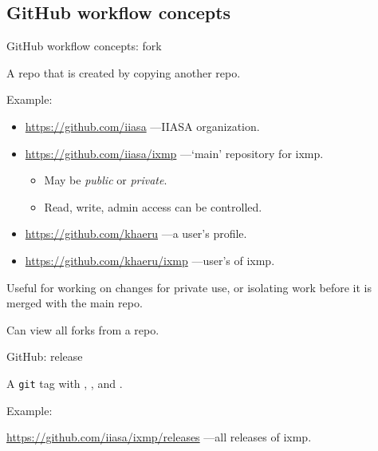 \documentclass[12pt,aspectratio=169]{beamer}
\begin{document}
\subsection{GitHub workflow concepts}
\begin{frame}{GitHub workflow concepts: fork}

  A repo that is created by copying another repo.

  \bigskip
  Example:
  \begin{itemize}
    \item \url{https://github.com/iiasa} —IIASA organization.
    \item \url{https://github.com/iiasa/ixmp} —‘main’ repository for ixmp.
          \begin{itemize}
            \item May be \emph{public} or \emph{private}.
            \item Read, write, admin access can be controlled.
          \end{itemize}
    \item \url{https://github.com/khaeru} —a user's profile.
    \item \url{https://github.com/khaeru/ixmp} ­—user's  of ixmp.
  \end{itemize}

  \bigskip
  Useful for working on changes for private use, or isolating work before it is merged with the main repo.

  Can view all forks from a repo.

\end{frame}


\begin{frame}{GitHub: release}

  { \Large
    A \texttt{git} tag with , , and .}

  \bigskip
  Example:

  \url{https://github.com/iiasa/ixmp/releases} —all releases of ixmp.

\end{frame}
\end{document}
